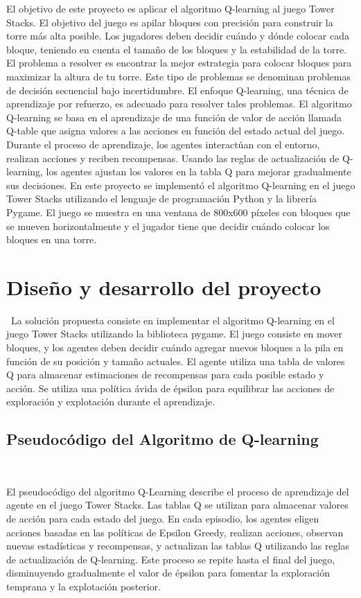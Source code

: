 \documentclass[a4paper]{article}
\begin{document}
 El objetivo de este proyecto es aplicar el algoritmo  Q-learning al juego  Tower Stacks. El objetivo del juego es apilar bloques con precisión para construir la torre  más alta posible. Los jugadores deben decidir cuándo y dónde colocar cada bloque, teniendo en cuenta el tamaño de los bloques y la estabilidad de la torre. 
  El problema a resolver es encontrar la mejor estrategia  para colocar  bloques para maximizar la altura de tu torre. Este tipo de problemas se denominan problemas de decisión secuencial bajo incertidumbre. El enfoque  Q-learning, una técnica de aprendizaje por refuerzo, es adecuado para resolver tales problemas.  
 El algoritmo  Q-learning se basa en el aprendizaje de una función de valor de acción llamada Q-table que asigna valores a las acciones en función del estado actual del juego. Durante el proceso de aprendizaje, los agentes interactúan con el entorno, realizan acciones y reciben recompensas. Usando las reglas de actualización de Q-learning, los agentes ajustan los valores en la tabla Q para mejorar gradualmente sus decisiones. 
  En este proyecto se implementó el algoritmo  Q-learning en el juego  Tower Stacks utilizando el lenguaje de programación Python y la librería Pygame. El juego se muestra en una ventana de 800x600 píxeles con bloques que se mueven horizontalmente y el jugador tiene que decidir cuándo colocar los bloques en una torre.
  
\section{Diseño y desarrollo del proyecto}\
La solución propuesta consiste en implementar el algoritmo  Q-learning en el juego  Tower Stacks utilizando la biblioteca pygame. El juego consiste en mover bloques, y los agentes deben decidir cuándo agregar nuevos bloques a la pila en función de su posición y tamaño actuales. El agente utiliza una tabla de valores Q para almacenar  estimaciones de recompensas para cada posible estado y acción. Se utiliza una política ávida de épsilon para equilibrar las acciones de exploración y  explotación  durante el aprendizaje.

\subsection{Pseudocódigo del Algoritmo de Q-learning}\


El pseudocódigo del algoritmo Q-Learning describe el proceso de aprendizaje del agente en el juego  Tower Stacks. Las tablas Q se utilizan para almacenar  valores de acción para cada estado del juego. En cada episodio, los agentes eligen acciones basadas en las políticas de Epsilon Greedy, realizan acciones, observan nuevas estadísticas y recompensas, y actualizan las tablas Q utilizando las reglas de actualización de Q-learning. Este proceso se repite hasta  el final del juego, disminuyendo gradualmente el valor de épsilon para fomentar la exploración temprana y la explotación posterior.
\end{document}
